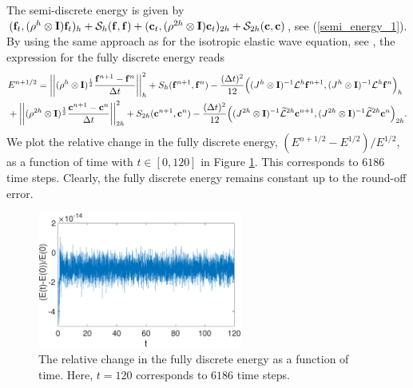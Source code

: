 The semi-discrete energy is given by $({\bf f}_t,({\rho}^h\otimes{\bf I}){\bf f}_t)_h + \mathcal{S}_h({\bf f},{\bf f}) + ({\bf c}_t,({\rho}^{2h}\otimes{\bf I}){\bf c}_t)_{2h} + \mathcal{S}_{2h}({\bf c},{\bf c})$, see (\ref{semi_energy_1}). By using the same approach as for the isotropic elastic wave equation, see \cite{petersson2015wave,sjogreen2012fourth},  the expression for the fully discrete energy reads 
\begin{align*}
&E^{n+1/2} = \left|\left|(\rho^h\otimes {\bf I})^{\frac{1}{2}}\frac{{\bf f}^{n+1}-{\bf f}^n}{\Delta t}\right|\right|_h^2 + S_h({\bf f}^{n+1},{\bf f}^n) - \frac{(\Delta t)^2}{12}\Big((J^h\otimes{\bf I})^{-1}\mathcal{L}^h{\bf f}^{n+1},(J^h\otimes{\bf I})^{-1}\mathcal{L}^h{\bf f}^n\Big)_h\\
&+ \left|\left|(\rho^{2h}\otimes{\bf I})^{\frac{1}{2}}\frac{{\bf c}^{n+1}-{\bf c}^n}{\Delta t}\right|\right|_{2h}^2 + S_{2h}({\bf c}^{n+1},{\bf c}^n) - \frac{(\Delta t)^2}{12}\Big((J^{2h}\otimes{\bf I})^{-1}\widetilde{\mathcal{L}}^{2h}{\bf c}^{n+1},(J^{2h}\otimes{\bf I})^{-1}\widetilde{\mathcal{L}}^{2h}{\bf c}^n\Big)_{2h}.
\end{align*}
We plot the relative change in the fully discrete energy, $(E^{n+1/2}-E^{1/2})/E^{1/2}$, as a function of time with $t\in[0,120]$ in Figure \ref{discrete_energy}. This corresponds to $6186$ time steps. Clearly, the fully discrete energy remains constant up to the round-off error.
\begin{figure}[htbp]
	\centering
	\includegraphics[width=0.6\textwidth,trim={0cm 0cm 0cm 0cm}, clip]{discrete_energy.eps}
	\caption{The relative change in the fully discrete energy as a function of time. Here, $t = 120$ corresponds to $6186$ time steps.}\label{discrete_energy}
\end{figure}



